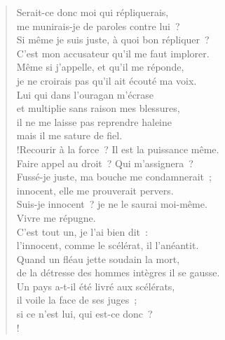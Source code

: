 \documentclass[french,twoside]{book} %
\def\mednobreak{\ifdim\lastskip<\medskipamount
  \removelastskip\nopagebreak\medskip\fi}
\newcommand{\labelblock}[1]{\medbreak{\noindent\color{rubric}\bfseries #1}\par\mednobreak}
\begin{document}
\begin{verse}
Serait-ce donc moi qui répliquerais, \\
me munirais-je de paroles contre lui ?\\
Si même je suis juste, à quoi bon répliquer ? \\
C’est mon accusateur qu’il me faut implorer.\\
Même si j’appelle, et qu’il me réponde, \\
je ne croirais pas qu’il ait écouté ma voix.\\
Lui qui dans l’ouragan m’écrase \\
et multiplie sans raison mes blessures,\\
il ne me laisse pas reprendre haleine \\
mais il me sature de fiel.\\!Recourir à la force ? Il est la puissance même. \\
Faire appel au droit ? Qui m’assignera ?\\
Fussé-je juste, ma bouche me condamnerait ; \\
innocent, elle me prouverait pervers.\\
Suis-je innocent ? je ne le saurai moi-même. \\
Vivre me répugne.\\
C’est tout un, je l’ai bien dit : \\
l’innocent, comme le scélérat, il l’anéantit.\\
Quand un fléau jette soudain la mort, \\
de la détresse des hommes intègres il se gausse.\\
Un pays a-t-il été livré aux scélérats, \\
il voile la face de ses juges ; \\
si ce n’est lui, qui est-ce donc ?\\!
\end{verse}

\labelblock{Inhumanité de Dieu}
\end{document}
